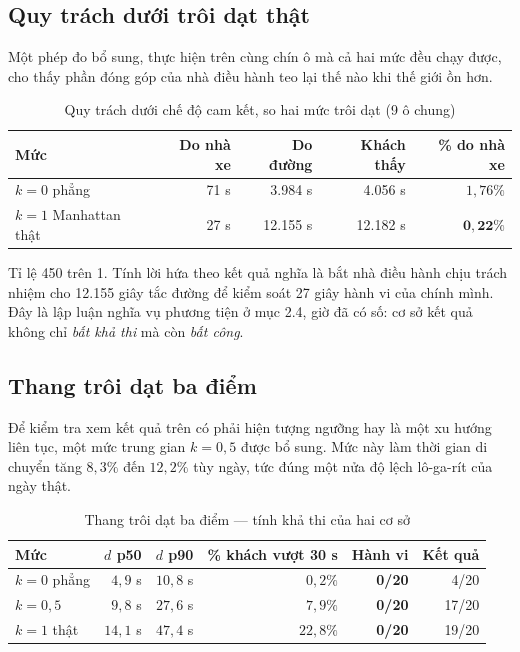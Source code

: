 \subsection{Quy trách dưới trôi dạt thật}

Một phép đo bổ sung, thực hiện trên cùng chín ô mà cả hai mức đều chạy được, cho thấy phần đóng
góp của nhà điều hành teo lại thế nào khi thế giới ồn hơn.

\begin{table}[htbp]
\centering
\caption{Quy trách dưới chế độ cam kết, so hai mức trôi dạt (9 ô chung)}
\label{bang:quytrach-troidat}
\small
\begin{tabular}{@{}lrrrr@{}}
\toprule
\textbf{Mức} & \textbf{Do nhà xe} & \textbf{Do đường} & \textbf{Khách thấy} & \textbf{\% do nhà xe}\\
\midrule
$k=0$ phẳng & 71 s & 3.984 s & 4.056 s & $1{,}76\%$\\
$k=1$ Manhattan thật & 27 s & 12.155 s & 12.182 s & $\mathbf{0{,}22\%}$\\
\bottomrule
\end{tabular}
\end{table}

Tỉ lệ 450 trên 1. Tính lời hứa theo kết quả nghĩa là bắt nhà điều hành chịu trách nhiệm cho
12.155 giây tắc đường để kiểm soát 27 giây hành vi của chính mình. Đây là lập luận nghĩa vụ
phương tiện ở mục 2.4, giờ đã có số: cơ sở kết quả không chỉ \emph{bất khả thi} mà còn
\emph{bất công}.

\subsection{Thang trôi dạt ba điểm}

Để kiểm tra xem kết quả trên có phải hiện tượng ngưỡng hay là một xu hướng liên tục, một mức
trung gian $k = 0{,}5$ được bổ sung. Mức này làm thời gian di chuyển tăng $8{,}3\%$ đến
$12{,}2\%$ tùy ngày, tức đúng một nửa độ lệch lô-ga-rít của ngày thật.

\begin{table}[htbp]
\centering
\caption{Thang trôi dạt ba điểm --- tính khả thi của hai cơ sở}
\label{bang:thang-troidat}
\small
\begin{tabular}{@{}lrrrrr@{}}
\toprule
\textbf{Mức} & $d$ \textbf{p50} & $d$ \textbf{p90} & \textbf{\% khách vượt 30 s} & \textbf{Hành vi} & \textbf{Kết quả}\\
\midrule
$k=0$ phẳng & $4{,}9$ s & $10{,}8$ s & $0{,}2\%$ & \textbf{0/20} & 4/20\\
$k=0{,}5$ & $9{,}8$ s & $27{,}6$ s & $7{,}9\%$ & \textbf{0/20} & 17/20\\
$k=1$ thật & $14{,}1$ s & $47{,}4$ s & $22{,}8\%$ & \textbf{0/20} & 19/20\\
\bottomrule
\end{tabular}
\end{table}

